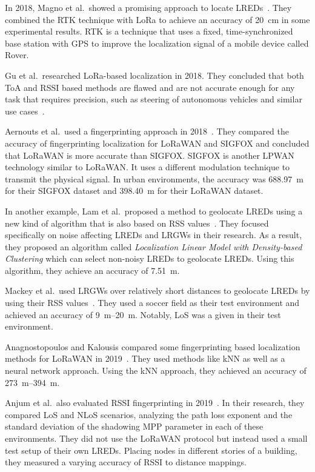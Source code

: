 In 2018, Magno et al.\ showed a promising approach to locate \aclp{LRED}~\cite{magno_poster_2018}.
They combined the \acf{RTK} technique with \ac{LoRa} to achieve an accuracy of \SI{20}{\centi\meter} in some experimental results.
\ac{RTK} is a technique that uses a fixed, time-synchronized base station with \ac{GPS} to improve the localization signal of a mobile device called Rover.

Gu et al.\ researched \ac{LoRa}-based localization in 2018.
They concluded that both \ac{ToA} and \ac{RSSI} based methods are flawed and are not accurate enough for any task that requires precision, such as steering of autonomous vehicles and similar use cases~\cite{gu_lora-based_2018}.

Aernouts et al.\ used a fingerprinting approach in 2018~\cite{aernouts_sigfox_2018}.
They compared the accuracy of fingerprinting localization for \ac{LoRaWAN} and SIGFOX and concluded that \ac{LoRaWAN} is more accurate than SIGFOX.
SIGFOX is another \ac{LPWAN} technology similar to \ac{LoRaWAN}.
It uses a different modulation technique to transmit the physical signal.
In urban environments, the accuracy was \SI{688.97}{\meter} for their SIGFOX dataset and \SI{398.40}{\meter} for their LoRaWAN dataset.

In another example, Lam et al.~proposed a method to geolocate \aclp{LRED} using a new kind of algorithm that is also based on \ac{RSS} values~\cite{lam_new_2018}.
They focused specifically on noise affecting \aclp{LRED} and \aclp{LRGW} in their research.
As a result, they proposed an algorithm called \emph{Localization Linear Model with Density-based Clustering} which can select non-noisy \aclp{LRED} to geolocate \aclp{LRED}.
Using this algorithm, they achieve an accuracy of \SI{7.51}{\meter}.

Mackey et al.~used \aclp{LRGW} over relatively short distances to geolocate \aclp{LRED} by using their \ac{RSS} values~\cite{mackey_lora-based_2019}.
They used a soccer field as their test environment and achieved an accuracy of \SIrange{9}{20}{\meter}.
Notably, \ac{LoS} was a given in their test environment.

Anagnostopoulos and Kalousis compared some fingerprinting based localization methods for \ac{LoRaWAN} in 2019~\cite{anagnostopoulos_reproducible_2019}.
They used methods like \ac{kNN} as well as a neural network approach.
Using the \ac{kNN} approach, they achieved an accuracy of \SIrange{273}{394}{\meter}.

Anjum et al.\ also evaluated \ac{RSSI} fingerprinting in 2019~\cite{anjum_analysis_2019}.
In their research, they compared \ac{LoS} and \ac{NLoS} scenarios, analyzing the path loss exponent and the standard deviation of the shadowing \ac{MPP} parameter in each of these environments.
They did not use the \ac{LoRaWAN} protocol but instead used a small test setup of their own \aclp{LRED}.
Placing nodes in different stories of a building, they measured a varying accuracy of \ac{RSSI} to distance mappings.

